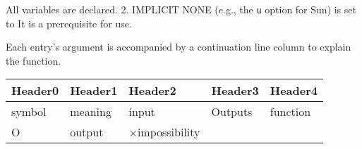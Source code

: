 All variables are declared. 2. IMPLICIT NONE (e.g., the {\texttt{u}}
option for Sun) is set to It is a prerequisite for use.

Each entry's argument is accompanied by a continuation line column to
explain the function.

\begin{longtable}[]{@{}lllll@{}}
\toprule
\begin{minipage}[b]{0.17\columnwidth}\raggedright
Header0\strut
\end{minipage} & \begin{minipage}[b]{0.17\columnwidth}\raggedright
Header1\strut
\end{minipage} & \begin{minipage}[b]{0.17\columnwidth}\raggedright
Header2\strut
\end{minipage} & \begin{minipage}[b]{0.17\columnwidth}\raggedright
Header3\strut
\end{minipage} & \begin{minipage}[b]{0.17\columnwidth}\raggedright
Header4\strut
\end{minipage}\tabularnewline
\midrule
\endhead
\begin{minipage}[t]{0.17\columnwidth}\raggedright
symbol\strut
\end{minipage} & \begin{minipage}[t]{0.17\columnwidth}\raggedright
meaning\strut
\end{minipage} & \begin{minipage}[t]{0.17\columnwidth}\raggedright
input\strut
\end{minipage} & \begin{minipage}[t]{0.17\columnwidth}\raggedright
Outputs\strut
\end{minipage} & \begin{minipage}[t]{0.17\columnwidth}\raggedright
function\strut
\end{minipage}\tabularnewline
\begin{minipage}[t]{0.17\columnwidth}\raggedright
O\strut
\end{minipage} & \begin{minipage}[t]{0.17\columnwidth}\raggedright
output\strut
\end{minipage} & \begin{minipage}[t]{0.17\columnwidth}\raggedright
×impossibility\strut
\end{minipage} & \begin{minipage}[t]{0.17\columnwidth}\raggedright

\end{minipage}
\end{longtable}
